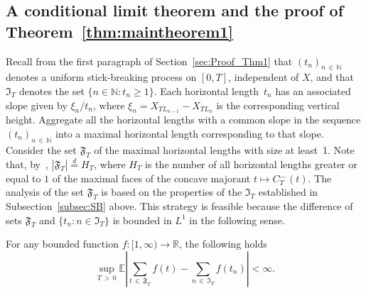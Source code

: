 \documentclass[AHL,Unicode,longabstracts,published]{cedram}
\newcommand\N{\mathbb{N}}
\newcommand\R{\mathbb{R}}
\newcommand\E{\mathds{E}}
\newcommand\1{\mathds{1}}
\newcommand\GF{\mathfrak{F}}
\newcommand\GI{\mathfrak{I}}
\newcommand\eqd{\overset{d}{=}}
\begin{document}
\subsection{A conditional limit theorem and the proof of Theorem~\ref{thm:maintheorem1}}\label{subsec:proof_thm1}


Recall from the first paragraph of Section~\ref{sec:Proof_Thm1} that $(t_n)_{n\,\in\,\N}$ denotes a uniform stick-breaking process on $[0,T]$, independent of $X$, and that $\GI_T$ denotes the set $\{n\in\N:t_n\ge 1\}$. Each horizontal length~$t_n$ has an associated slope given by $\xi_n/t_n$, where $\xi_n=X_{TL_{n-1}}-X_{TL_n}$ is the corresponding vertical height. Aggregate all the horizontal lengths with a common slope in the sequence $(t_n)_{n\,\in\,\N}$ into a maximal horizontal length corresponding to that slope. Consider the set $\GF_T$ of the maximal horizontal lengths with size at least~1. Note that, by~\cite[Theorem~11]{CM_Fluctuation_Levy}, $|\GF_T|\eqd H_T$, where $H_T$ is the number of all horizontal lengths greater or equal to $1$ of the maximal faces of the concave majorant $t\mapsto C_T^\frown(t)$. The analysis of the set $\GF_T$ is based on the properties of the $\GI_T$ established in Subsection~\ref{subsec:SB} above. This strategy is feasible because the difference of sets $\GF_T$ and $\{t_n:n\in\GI_T\}$ is bounded in $L^1$ in the following sense.



\begin{lemm}\label{lem:face_discrepancy}
For any bounded function $f:[1,\infty)\to\R$, the following holds
\[
\sup_{T\,>\,0}\E\left|\sum_{t\,\in\,\GF_T}f(t) -\sum_{n\,\in\,\GI_T}f(t_n)\right|<\infty.
\]
\end{lemm}
\end{document}
